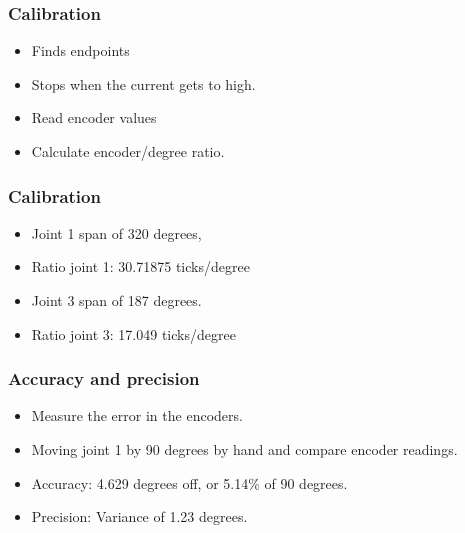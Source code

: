 \documentclass{beamer}
\begin{document}
  \begin{frame}
	\frametitle{Calibration}
	  \begin{itemize}
      	\item Finds endpoints
      	\item Stops when the current gets to high.
      	\item Read encoder values
      	\item Calculate encoder/degree ratio.
      \end{itemize}
  \end{frame}
  
    \begin{frame}
	\frametitle{Calibration}
	  \begin{itemize}
      	\item Joint 1 span of 320 degrees, 
      	\item Ratio joint 1: 30.71875 ticks/degree
      	\item Joint 3 span of 187 degrees.
      	\item Ratio joint 3: 17.049 ticks/degree
      \end{itemize}
  \end{frame}
  
  
  \begin{frame}
    \frametitle{Accuracy and precision}
    \begin{itemize}
      \item Measure the error in the encoders.
      \item Moving joint 1 by 90 degrees by hand and compare encoder readings.
      \item Accuracy: 4.629 degrees off, or 5.14\% of 90 degrees.
      \item Precision: Variance of 1.23 degrees.
	\end{itemize}
  \end{frame}
  
  \begin{frame}
  \end{frame}
\end{document}
